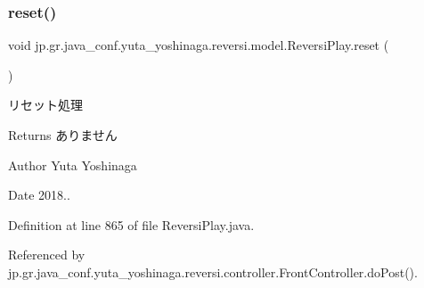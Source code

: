 \subsubsection{\texorpdfstring{reset()}{reset()}}
{\footnotesize\ttfamily void jp.\+gr.\+java\+\_\+conf.\+yuta\+\_\+yoshinaga.\+reversi.\+model.\+Reversi\+Play.\+reset (\begin{DoxyParamCaption}{ }\end{DoxyParamCaption})}



リセット処理 

\begin{DoxyReturn}{Returns}
ありません 
\end{DoxyReturn}
\begin{DoxyAuthor}{Author}
Yuta Yoshinaga 
\end{DoxyAuthor}
\begin{DoxyDate}{Date}
2018.. 
\end{DoxyDate}


Definition at line 865 of file Reversi\+Play.\+java.



Referenced by jp.\+gr.\+java\+\_\+conf.\+yuta\+\_\+yoshinaga.\+reversi.\+controller.\+Front\+Controller.\+do\+Post().

